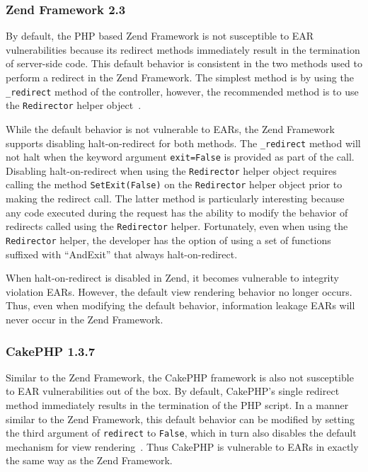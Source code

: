 \subsubsection{Zend Framework 2.3}
By default, the PHP based Zend Framework is not susceptible to EAR
vulnerabilities because its redirect methods immediately result in
the termination of server-side code. This default behavior is consistent in
the two methods used to perform a redirect in the Zend Framework. The simplest
method is by using the \texttt{\_redirect} method of the controller, however,
the recommended method is to use the \texttt{Redirector} helper
object~\cite{zend-redirector}.

While the default behavior is not vulnerable to EARs, the Zend Framework
supports disabling halt-on-redirect for both methods. The \texttt{\_redirect}
method will not halt when the keyword argument \texttt{exit=False} is provided
as part of the call. Disabling halt-on-redirect when using the
\texttt{Redirector} helper object requires calling the method \texttt{SetExit(False)} on the
\texttt{Redirector} helper object prior to making the redirect call. The latter
method is particularly interesting because any code executed
during the request has the ability to modify the behavior of redirects called
using the \texttt{Redirector} helper. Fortunately, even when using the
\texttt{Redirector} helper, the developer has the option of using a set of
functions suffixed with ``AndExit'' that always halt-on-redirect.

When halt-on-redirect is disabled in Zend, it becomes vulnerable to
integrity violation EARs. However, the default view rendering behavior no
longer occurs. Thus, even when modifying the default behavior, information
leakage EARs will never occur in the Zend Framework.

\subsubsection{CakePHP 1.3.7}
Similar to the Zend Framework, the CakePHP framework is also not susceptible to
EAR vulnerabilities out of the box. By default, CakePHP's single redirect
method immediately results in the termination of the PHP script. In a manner
similar to the Zend Framework, this default behavior can be modified by setting
the third argument of \texttt{redirect} to \texttt{False}, which in turn also
disables the default mechanism for view rendering~\cite{cake-redirect}. Thus
CakePHP is vulnerable to EARs in exactly the same way as the Zend Framework.

